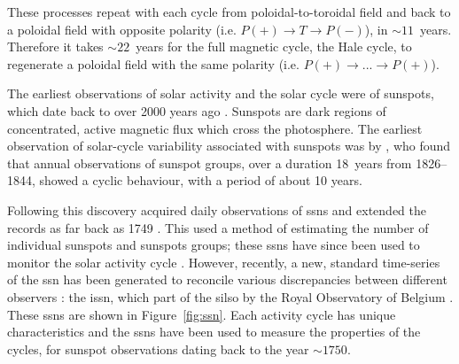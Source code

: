 

These processes repeat with each cycle from poloidal-to-toroidal field and back to a poloidal field with opposite polarity (i.e. $P(+)\rightarrow T\rightarrow P(-)$), in $\sim11$~years. Therefore it takes $\sim22$~years for the full magnetic cycle, the Hale cycle, to regenerate a poloidal field with the same polarity (i.e. $P(+)\rightarrow ...\rightarrow P(+)$).

The earliest observations of solar activity and the solar cycle were of sunspots, which date back to over 2000 years ago \citep{clark_interpretation_1978}. Sunspots are dark regions of concentrated, active magnetic flux which cross the photosphere. The earliest observation of solar-cycle variability associated with sunspots was by \citet{schwabe_sonnenbeobachtungen_1844}, who found that annual observations of sunspot groups, over a duration 18~years from 1826--1844, showed a cyclic behaviour, with a period of about 10 years.

Following this discovery \citet{wolf_mittheilungen_1856, wolf_extract_1859} acquired daily observations of \glspl{ssn} and extended the records as far back as 1749 \citep{hathaway_solar_2015}. This used a method of estimating the number of individual sunspots and sunspots groups; these \glspl{ssn} have since been used to monitor the solar activity cycle \citep{wolf_extract_1859, wolf_abstract_1861}. However, recently, a new, standard time-series of the \gls{ssn} has been generated to reconcile various discrepancies between different observers \citep{clette_preface_2016,clette_new_2016}: the \gls{issn}, which part of the \gls{silso} by the Royal Observatory of Belgium \citep{silso_world_data_center_international_2020}. These \glspl{ssn} are shown in Figure~\ref{fig:ssn}. Each activity cycle has unique characteristics and the \glspl{ssn} have been used to measure the properties of the cycles, for sunspot observations dating back to the year $\sim1750$.

